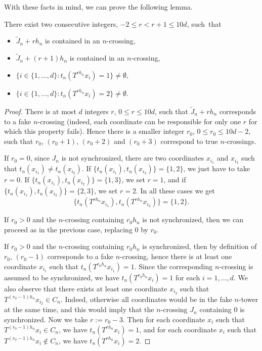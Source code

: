 \documentclass[AHL,Unicode,longabstracts]{cedram}
\newcommand{\egdef}{:=}
\begin{document}
With these facts in mind, we can prove the following lemma.

\begin{lemm}\label{lemma:thirdcase}
There exist two consecutive integers, $-2\le r<r+1\le 10d$, such~that
\begin{itemize}
\item $\tilde J_n+rh_n$ is contained in an $n$-crossing,
\item $\tilde J_n+(r+1)h_n$ is contained in an $n$-crossing,
\item $\bigl\{i\in\{1,\ldots,d\}:t_n(T^{rh_n}x_i)=1\bigr\}\neq\emptyset,$
\item $\bigl\{i\in\{1,\ldots,d\}:t_n(T^{rh_n}x_i)=2\bigr\}\neq\emptyset.$
\end{itemize}
\end{lemm}

\begin{proof}
There is at most $d$ integers $r$, $0\le r\le 10d$, such that $\tilde J_n+rh_n$ corresponds to a fake $n$-crossing (indeed, each coordinate can be responsible for only one $r$ for which this property fails). Hence there is a smaller integer $r_0$, $0\le r_0\le 10d-2$, such that $r_0$, $(r_0+1)$, $(r_0+2)$ and $(r_0+3)$ correspond to true $n$-crossings.

If $r_0=0$, since $J_n$ is not synchronized, there are two coordinates $x_{i_1}$ and $x_{i_2}$ such that $t_n(x_{i_1})\neq t_n(x_{i_2})$. If $\{t_n(x_{i_1}),t_n(x_{i_2})\}=\{1,2\}$, we just have to take $r=0$. If $\{t_n(x_{i_1}),t_n(x_{i_2})\}=\{1,3\}$, we set $r=1$, and if $\{t_n(x_{i_1}),t_n(x_{i_2})\}=\{2,3\}$, we set $r=2$. In all these cases we get
\[
\{t_n(T^{rh_n}x_{i_1}),t_n(T^{rh_n}x_{i_2})\}=\{1,2\}.
\]

If $r_0>0$ and the $n$-crossing containing $r_0h_n$ is not synchronized, then we can proceed as in the previous case, replacing 0 by $r_0$.

If $r_0>0$ and the $n$-crossing containing $r_0h_n$ is synchronized, then by definition of $r_0$, $(r_0-1)$ corresponds to a fake $n$-crossing, hence there is at least one coordinate $x_{i_1}$ such that $t_n(T^{r_0h_n}x_{i_1})=1$. Since the corresponding $n$-crossing is assumed to be synchronized, we have $t_n(T^{r_0h_n}x_{i})=1$ for each $i=1,\ldots,d$. We also observe that there exists at least one coordinate $x_{i_2}$ such that $T^{(r_0-1)h_n}x_{i_2}\in C_n$. Indeed, otherwise all coordinates would be in the fake $n$-tower at the same time, and this would imply that the $n$-crossing $J_n$ containing 0 is synchronized. Now we take $r\egdef r_0-3$. Then for each coordinate $x_i$ such that $T^{(r_0-1)h_n}x_{i}\in C_n$, we have $t_n(T^{rh_n}x_{i})=1$, and for each coordinate $x_i$ such that $T^{(r_0-1)h_n}x_{i}\notin C_n$, we have $t_n(T^{rh_n}x_{i})=2$.
\end{proof}
\end{document}
